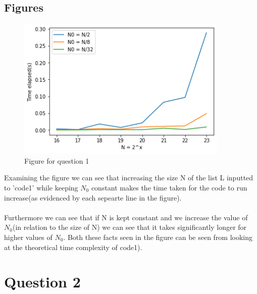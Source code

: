 \documentclass{article}
\begin{document}
\subsection*{Figures}
\begin{figure}[h!]
\centering
\includegraphics[width=0.9\textwidth]{code1.png}
\caption{Figure for question 1}
\label{fig1}
\end{figure}

Examining the figure we can see that increasing the size N of the list L inputted to 'code1' while keeping $N_0$ constant makes the time taken for the code to run increase(as evidenced by each sepearte line in the figure).
\\ \\Furthermore we can see that if N is kept constant and we increase the value of $N_0$(in relation to the size of N) we can see that it takes significantly longer for higher values of $N_0$. Both these facts seen in the figure can be seen from looking at the theoretical time complexity of code1).


\vspace{0.25in}

\section*{Question 2}
\end{document}
